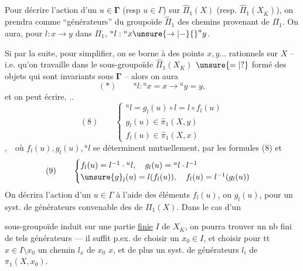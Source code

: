
Pour décrire l'action d'un $u\in\mathbf{\Gamma}$ (resp $u\in\Gamma$) sur $\widehat\Pi_1(X)$ (resp.  $\widehat\Pi_1(X_{\bar K})$), on prendra comme ``générateurs'' du groupoïde $\widehat\Pi_1$ des chemins provenant de $\Pi_1$. On aura, pour ${l}:x\to y$ dans $\Pi_1$, ${}^u{l}:{}^ux\unsure{\to|-}{}^uy$.

Si  par la suite, pour simplifier, on se borne à des points $x,y\ldots$ rationnels sur $X$ -- i.e. qu'on travaille dans le sous-groupoïde $\widehat\Pi_1(X_K)$ $\unsure{=|?}$ formé des objets qui sont invariants sous $\mathbf{\Gamma}$ -- alors on aura
\[
(*)\qquad{}^u{l}:{}^ux=x\longrightarrow{}^uy=y,
\]
et on peut écrire, ..
\[
(8)\qquad\begin{cases}
{}^u{l}=g_{l}(u)\circ{l}={l}\circ f_{l}(u)\\
g_{l}(u)\in\widehat\pi_1(X,y)\\
f_{l}(u)\in\widehat\pi_1(X,x)
\end{cases}
\]
,\,\,\,\,
où $f_{l}(u),g_{l}(u),{}^u{l}$ se déterminent mutuellement,  par les formules (8) et
\[
(9)\qquad\begin{cases}
f_{l}(u)={l}^{-1}\cdot{}^u{l},\quad g_{l}(u)={}^u{l}\cdot{l}^{-1}\\
\unsure{g}_{l}(u)={l}(f_{l}(u)),\quad f_{l}(u)={l}^{-1}(g_{l}(u))
\end{cases}
\]
On décrira l'action d'un $u\in\Gamma$  à l'aide des éléments $f_{l}(u)$, ou $g_{l}(u)$, pour un syst. de générateurs convenable des   de $\Pi_1(X)$. Dans le cas d'un


sous-groupoïde induit sur une partie \uline{finie}  $I$ de $X_K$, on pourra trouver un nb fini de tels générateurs --- il suffit p.ex. de choisir un  $x_0\in I$, et choisir pour tt $x\in I\setminus x_0$ un chemin $l_x$ de $x_0$  $x$, et de plus un syst.  de générateurs $l_i$ de $\pi_1(X,x_0)$.

